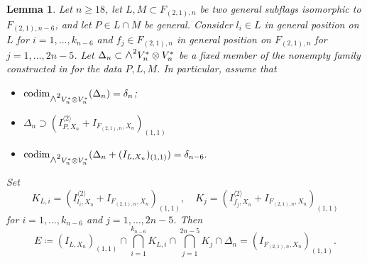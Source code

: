 \documentclass[a4paper,reqno]{amsart}
\theoremstyle{plainnopunct}
\newtheorem{lemma}[lemma]{Lemma}
\theoremstyle{definitionnopunct}
\newcommand{\superwedge}{\mathlarger{\mathlarger{\wedge}}}
\newcommand{\codim}{\operatorname{codim}}
\begin{document}
\begin{lemma}\label{lemL}
Let $n\geq18$, let
$L,M\subset F_{(2,1),n}$ be two general subflags isomorphic to
$F_{(2,1),n-6}$, and let $P\in L\cap M$ be general.
Consider $l_i\in L$ in general position on $L$ for
$i=1,\dots,k_{n-6}$ and
$f_j\in F_{(2,1),n}$ in general position on
$F_{(2,1),n}$ for $j=1,\dots,2n-5$.
Let
$\Delta_n\subset\superwedge^2V_n^*\otimes V_n^*$
be a fixed member of the nonempty family constructed in
 for the data $P,L,M$. In particular, assume
that
\begin{itemize}[leftmargin=*]
\item $\codim_{\superwedge^2V_n^*\otimes V_n^*}(\Delta_n)=\delta_n$;
\item $\Delta_n\supset(I_{P,X_n}^{\langle2\rangle}+I_{F_{(2,1),n},X_n})_{(1,1)}$
\item $\codim_{\superwedge^2V_n^*\otimes V_n^*}(\Delta_n+(I_{L,X_n})_{(1,1)})=\delta_{n-6}.$
\end{itemize}
Set
$$K_{L,i}=(I^{\langle2\rangle}_{l_i,X_n}+I_{F_{(2,1),n},X_n})_{(1,1)}, \quad K_j=(I^{\langle2\rangle}_{f_j,X_n}+I_{F_{(2,1),n},X_n})_{(1,1)}$$
for $i=1,\dots,k_{n-6}$ and $j=1,\dots,2n-5$. 
Then
$$E\coloneq(I_{L,X_n})_{(1,1)}\cap\bigcap_{i=1}^{k_{n-6}}K_{L,i}\cap\bigcap_{j=1}^{2n-5}K_j\cap \Delta_n=(I_{F_{(2,1),n},X_n})_{(1,1)}.$$
\end{lemma}
\end{document}
